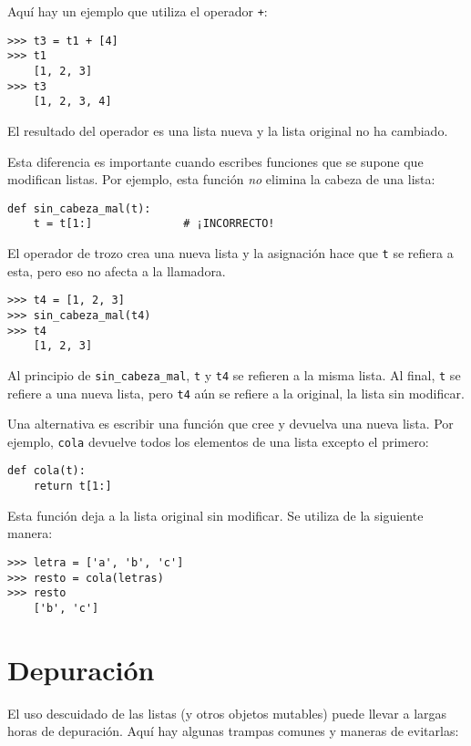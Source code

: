 \documentclass[10pt]{book}
\begin{document}
Aquí hay un ejemplo que utiliza el operador {\tt +}:
%
\begin{verbatim}
>>> t3 = t1 + [4]
>>> t1
    [1, 2, 3]
>>> t3
    [1, 2, 3, 4]
\end{verbatim}
%
El resultado del operador es una lista nueva y la lista original no ha
cambiado.

Esta diferencia es importante cuando escribes funciones que
se supone que modifican listas.  Por ejemplo, esta función
{\em no} elimina la cabeza de una lista:
%
\begin{verbatim}
def sin_cabeza_mal(t):
    t = t[1:]              # ¡INCORRECTO!
\end{verbatim}
%
El operador de trozo crea una nueva lista y la asignación
hace que {\tt t} se refiera a esta, pero eso no afecta a la llamadora.
%
\begin{verbatim}
>>> t4 = [1, 2, 3]
>>> sin_cabeza_mal(t4)
>>> t4
    [1, 2, 3]
\end{verbatim}
%
Al principio de \verb"sin_cabeza_mal", {\tt t} y {\tt t4}
se refieren a la misma lista.  Al final, {\tt t} se refiere a una nueva lista,
pero {\tt t4} aún se refiere a la original, la lista sin modificar.

Una alternativa es escribir una función que cree y
devuelva una nueva lista.  Por
ejemplo, {\tt cola} devuelve todos los elementos
de una lista excepto el primero:

\begin{verbatim}
def cola(t):
    return t[1:]
\end{verbatim}
%
Esta función deja a la lista original sin modificar.
Se utiliza de la siguiente manera:

\begin{verbatim}
>>> letra = ['a', 'b', 'c']
>>> resto = cola(letras)
>>> resto
    ['b', 'c']
\end{verbatim}



\section{Depuración}

El uso descuidado de las listas (y otros objetos mutables)
puede llevar a largas horas de depuración.  Aquí hay algunas
trampas comunes y maneras de evitarlas:
\end{document}
